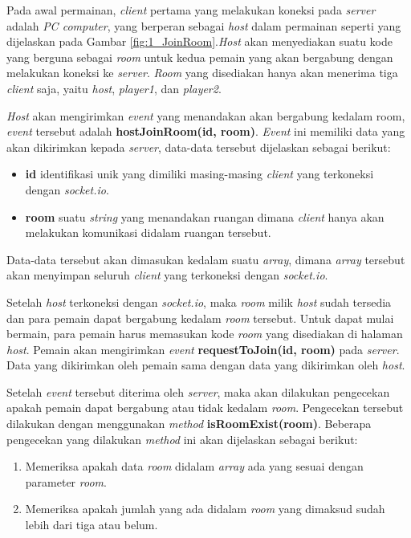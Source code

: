 Pada awal permainan, \textit{client} pertama yang melakukan koneksi pada \textit{server} adalah \textit{PC computer}, yang berperan sebagai \textit{host} dalam permainan seperti yang dijelaskan pada Gambar \ref{fig:1_JoinRoom}.\textit{Host} akan menyediakan suatu kode yang berguna sebagai \textit{room} untuk kedua pemain yang akan bergabung dengan melakukan koneksi ke \textit{server}. \textit{Room} yang disediakan hanya akan menerima tiga \textit{client} saja, yaitu \textit{host}, \textit{player1}, dan \textit{player2}. 

\textit{Host} akan mengirimkan \textit{event} yang menandakan akan bergabung kedalam room, \textit{event} tersebut adalah \textbf{hostJoinRoom(id, room)}. \textit{Event} ini memiliki data yang akan dikirimkan kepada \textit{server}, data-data tersebut dijelaskan sebagai berikut:
\begin{itemize}
	\item \textbf{id} identifikasi unik yang dimiliki masing-masing \textit{client} yang terkoneksi dengan \textit{socket.io}.
	\item \textbf{room} suatu \textit{string} yang menandakan ruangan dimana \textit{client} hanya akan melakukan komunikasi didalam ruangan tersebut.
\end{itemize}
Data-data tersebut akan dimasukan kedalam suatu \textit{array}, dimana \textit{array} tersebut akan menyimpan seluruh \textit{client} yang terkoneksi dengan \textit{socket.io}.

Setelah \textit{host} terkoneksi dengan \textit{socket.io}, maka \textit{room} milik \textit{host} sudah tersedia dan para pemain dapat bergabung kedalam \textit{room} tersebut. Untuk dapat mulai bermain, para pemain harus memasukan kode \textit{room} yang disediakan di halaman \textit{host}. Pemain akan mengirimkan \textit{event} \textbf{requestToJoin(id, room)} pada \textit{server}. Data yang dikirimkan oleh pemain sama dengan data yang dikirimkan oleh \textit{host}. 

Setelah \textit{event} tersebut diterima oleh \textit{server}, maka akan dilakukan pengecekan apakah pemain dapat bergabung atau tidak kedalam \textit{room}. Pengecekan tersebut dilakukan dengan menggunakan \textit{method} \textbf{isRoomExist(room)}. Beberapa pengecekan yang dilakukan \textit{method} ini akan dijelaskan sebagai berikut:
\begin{enumerate}
	\item Memeriksa apakah data \textit{room} didalam \textit{array} ada yang sesuai dengan parameter \textit{room}.
	\item Memeriksa apakah jumlah yang ada didalam \textit{room} yang dimaksud sudah lebih dari tiga atau belum.
\end{enumerate}

